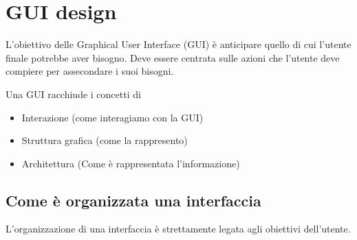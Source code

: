 \chapter{GUI design}
L'obiettivo delle Graphical User Interface (GUI) è anticipare quello di cui l'utente finale potrebbe aver bisogno. Deve essere centrata sulle azioni che l'utente deve compiere per assecondare i suoi bisogni.

Una GUI racchiude i concetti di

\begin{itemize}
    \item Interazione (come interagiamo con la GUI)
    \item Struttura grafica (come la rappresento)
    \item Architettura (Come è rappresentata l'informazione)
\end{itemize}

\section{Come è organizzata una interfaccia}

L'organizzazione di una interfaccia è strettamente legata agli obiettivi dell'utente.

